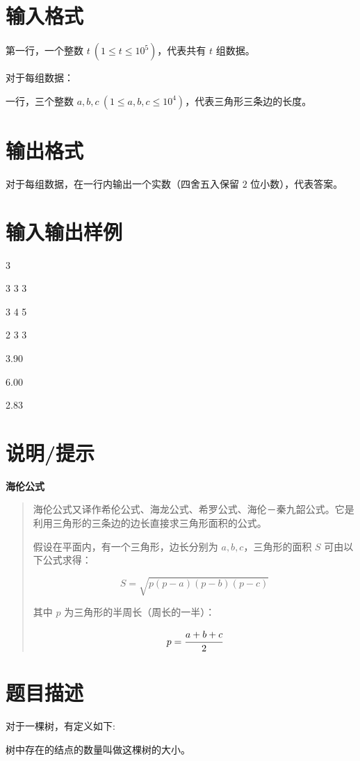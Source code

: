 \documentclass{ctpro}
\begin{document}
\section*{输入格式}
第一行，一个整数 $t~(1 \leq t \leq 10^5)$，代表共有 $t$ 组数据。

对于每组数据：

\indent \indent 一行，三个整数 $a,b,c~(1 \leq a,b,c \leq 10^4)$，代表三角形三条边的长度。

\section*{输出格式}
对于每组数据，在一行内输出一个实数（四舍五入保留 $2$ 位小数），代表答案。


\section*{输入输出样例}
\testcasetab
{
	3 \par
	3 3 3\par
	3 4 5\par
	2 3 3
}
{
	3.90\par
	6.00\par
	2.83\par
}

\section*{说明/提示}
\textbf{海伦公式}
\begin{quotation}
	海伦公式又译作希伦公式、海龙公式、希罗公式、海伦－秦九韶公式。它是利用三角形的三条边的边长直接求三角形面积的公式。

	假设在平面内，有一个三角形，边长分别为 $a,b,c$，三角形的面积 $S$ 可由以下公式求得：

	$$S=\sqrt{p(p-a)(p-b)(p-c)}$$

	其中 $p$ 为三角形的半周长（周长的一半）：

	$$p=\cfrac{a+b+c}{2}$$
\end{quotation}

\makeproblem
\section*{题目描述}
对于一棵树，有定义如下:

\begin{definition}[树的大小]
	树中存在的结点的数量叫做这棵树的大小。
\end{definition}
\end{document}
